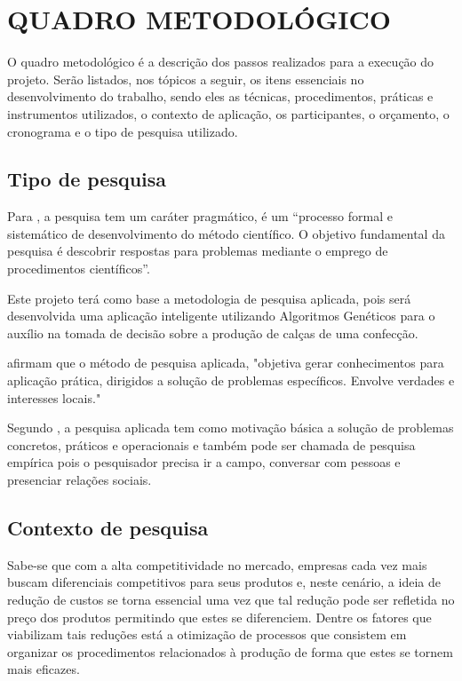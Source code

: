 
\chapter{QUADRO METODOLÓGICO}
\par O quadro metodológico é a descrição dos passos realizados para a 
execução do projeto. Serão listados, nos tópicos a seguir, os itens essenciais
no desenvolvimento do trabalho, sendo eles as técnicas, procedimentos, práticas e instrumentos
utilizados, o contexto de aplicação, os participantes, o orçamento, o cronograma
e o tipo de pesquisa utilizado.

\section{Tipo de pesquisa}

\par Para , a pesquisa tem um caráter
pragmático, é um “processo formal e sistemático de desenvolvimento do método científico. 
O objetivo fundamental da pesquisa é descobrir respostas para problemas mediante
o emprego de procedimentos científicos”.
\par Este projeto terá como base a metodologia de pesquisa aplicada, pois
será desenvolvida uma aplicação inteligente utilizando Algoritmos Genéticos para
o auxílio na tomada de decisão sobre a produção de calças de uma confecção.

\par {} afirmam que o método de
pesquisa aplicada, "objetiva gerar conhecimentos para aplicação prática, dirigidos a
solução de problemas específicos. Envolve verdades e interesses locais."  

\par Segundo , a pesquisa
aplicada tem como motivação básica a solução de problemas
concretos, práticos e operacionais e também pode ser chamada de pesquisa
empírica pois o pesquisador precisa ir a campo, conversar com pessoas e
presenciar relações sociais.

\section{Contexto de pesquisa}

\par Sabe-se que com a alta competitividade no mercado, empresas cada vez mais
buscam diferenciais competitivos para seus produtos e, neste cenário, a ideia
de redução de custos se torna essencial uma vez que tal redução pode ser
refletida no preço dos produtos permitindo que estes se diferenciem. Dentre
os fatores que viabilizam tais reduções está a otimização de processos que
consistem em organizar os procedimentos relacionados à produção de forma que
estes se tornem mais eficazes.

